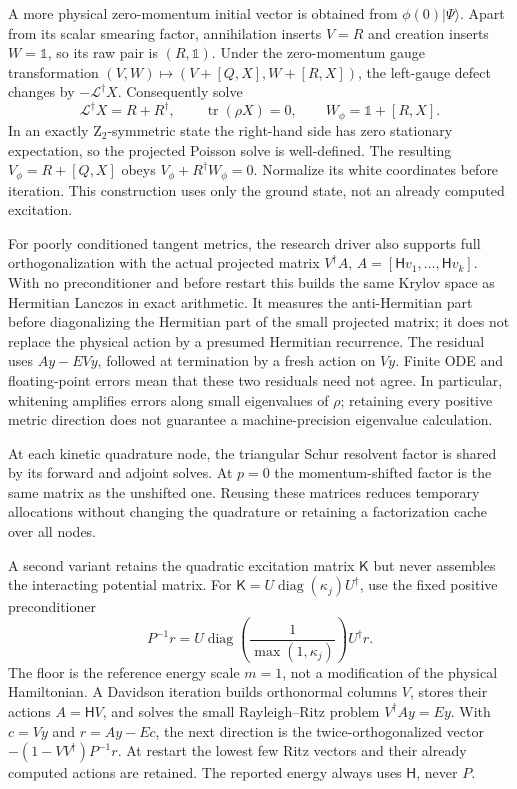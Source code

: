 \documentclass[11pt]{article}
\newcommand{\Id}{\mathbb{1}}
\begin{document}
A more physical zero-momentum initial vector is obtained from
$\phi(0)|\Psi\rangle$. Apart from its scalar smearing factor, annihilation
inserts $V=R$ and creation inserts $W=\Id$, so its raw pair is $(R,\Id)$.
Under the zero-momentum gauge transformation
$(V,W)\mapsto(V+[Q,X],W+[R,X])$, the left-gauge defect changes by
$-\mathcal L^\dagger X$. Consequently solve
\begin{equation}
 \mathcal L^\dagger X=R+R^\dagger,\qquad
 \operatorname{tr}(\rho X)=0,
 \qquad W_\phi=\Id+[R,X].
\end{equation}
In an exactly Z$_2$-symmetric state the right-hand side has zero stationary
expectation, so the projected Poisson solve is well-defined. The resulting
$V_\phi=R+[Q,X]$ obeys $V_\phi+R^\dagger W_\phi=0$.
Normalize its white coordinates before iteration. This construction uses
only the ground state, not an already computed excitation.

For poorly conditioned tangent metrics, the research driver also supports
full orthogonalization with the actual projected matrix $V^\dagger A$,
$A=[\mathsf Hv_1,\ldots,\mathsf Hv_k]$. With no preconditioner and before
restart this builds the same Krylov space as Hermitian Lanczos in exact
arithmetic. It measures the anti-Hermitian part before diagonalizing the
Hermitian part of the small projected matrix; it does not replace the
physical action by a presumed Hermitian recurrence. The residual uses
$Ay-EVy$, followed at termination by a fresh action on $Vy$.
Finite ODE and floating-point errors mean that these two residuals need
not agree. In particular, whitening amplifies errors along small
eigenvalues of $\rho$; retaining every positive metric direction does not
guarantee a machine-precision eigenvalue calculation.

At each kinetic quadrature node, the triangular Schur resolvent factor
is shared by its forward and adjoint solves. At $p=0$ the momentum-shifted
factor is the same matrix as the unshifted one. Reusing these matrices
reduces temporary allocations without changing the quadrature or retaining
a factorization cache over all nodes.

A second variant retains the quadratic excitation matrix $\mathsf K$ but
never assembles the interacting potential matrix. For
$\mathsf K=U\operatorname{diag}(\kappa_j)U^\dagger$, use the fixed positive
preconditioner
\begin{equation}
 P^{-1}r=U\operatorname{diag}\!\left(\frac1{\max(1,\kappa_j)}\right)U^\dagger r.
\end{equation}
The floor is the reference energy scale $m=1$, not a modification of the
physical Hamiltonian. A Davidson iteration builds orthonormal columns $V$,
stores their actions $A=\mathsf HV$, and solves the small Rayleigh--Ritz
problem $V^\dagger A y=Ey$. With $c=Vy$ and $r=Ay-Ec$, the next direction is
the twice-orthogonalized vector $-(1-VV^\dagger)P^{-1}r$. At restart the
lowest few Ritz vectors and their already computed actions are retained.
The reported energy always uses $\mathsf H$, never $P$.
\end{document}
